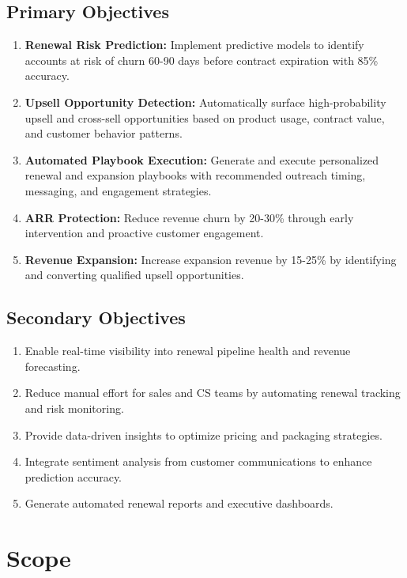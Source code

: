 \documentclass[12pt,a4paper]{article}
\begin{document}
\subsection{Primary Objectives}
\begin{enumerate}
    \item \textbf{Renewal Risk Prediction:} Implement predictive models to identify accounts at risk of churn 60-90 days before contract expiration with 85\% accuracy.
    \item \textbf{Upsell Opportunity Detection:} Automatically surface high-probability upsell and cross-sell opportunities based on product usage, contract value, and customer behavior patterns.
    \item \textbf{Automated Playbook Execution:} Generate and execute personalized renewal and expansion playbooks with recommended outreach timing, messaging, and engagement strategies.
    \item \textbf{ARR Protection:} Reduce revenue churn by 20-30\% through early intervention and proactive customer engagement.
    \item \textbf{Revenue Expansion:} Increase expansion revenue by 15-25\% by identifying and converting qualified upsell opportunities.
\end{enumerate}

\subsection{Secondary Objectives}
\begin{enumerate}
    \item Enable real-time visibility into renewal pipeline health and revenue forecasting.
    \item Reduce manual effort for sales and CS teams by automating renewal tracking and risk monitoring.
    \item Provide data-driven insights to optimize pricing and packaging strategies.
    \item Integrate sentiment analysis from customer communications to enhance prediction accuracy.
    \item Generate automated renewal reports and executive dashboards.
\end{enumerate}

\section{Scope}
\end{document}
